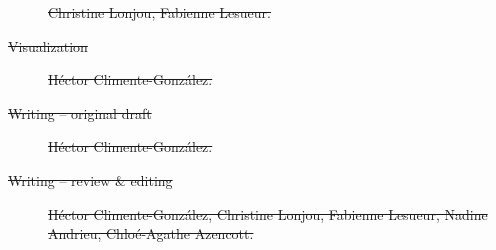\documentclass[10pt,letterpaper]{article}
\providecommand{\DIFdeltex}[1]{{\protect\color{red}\sout{#1}}}                      %
\providecommand{\DIFdelend}{} %
\providecommand{\DIFdel}[1]{\texorpdfstring{\DIFdeltex{#1}}{}} %
\DeclareRobustCommand{\DIFdelend}{\DIFOaddend \let\includegraphics\DIFOincludegraphics} %
\begin{document}
\begin{description}
\DIFdel{Christine Lonjou, Fabienne Lesueur.
  }%
\item[\DIFdel{Visualization}]%
\DIFdel{Héctor Climente-González.
  }%
\item[\DIFdel{Writing – original draft}]%
\DIFdel{Héctor Climente-González.
  }%
\item[\DIFdel{Writing – review \& editing}]%
\DIFdel{Héctor Climente-González, Christine Lonjou, Fabienne Lesueur, Nadine Andrieu, Chloé-Agathe Azencott.
}
\end{description}%




\DIFdelend 
\end{document}
